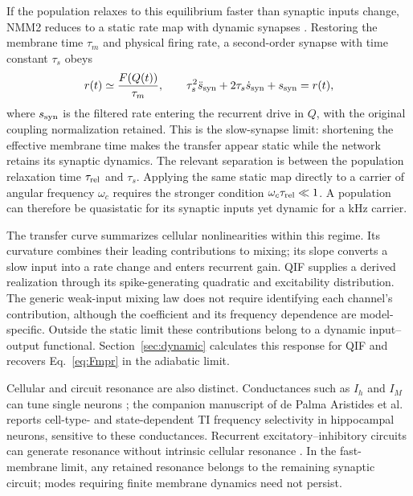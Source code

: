 \documentclass[11pt,a4paper]{article}
\begin{document}
If the population relaxes to this equilibrium faster than synaptic inputs change,
NMM2 reduces to a static rate map with dynamic synapses
\cite{ruffini2021nmm2,clusella2023}. Restoring the membrane time $\tau_m$ and physical
firing rate, a second-order synapse with time constant $\tau_s$ obeys
\begin{equation}
r(t)\simeq \frac{F(Q(t))}{\tau_m},\qquad
\tau_s^2\ddot s_{\rm syn}+2\tau_s\dot s_{\rm syn}+s_{\rm syn}=r(t),
\label{eq:slow_synapse}
\end{equation}
where $s_{\rm syn}$ is the filtered rate entering the recurrent drive in $Q$, with the original
coupling normalization retained. This is the slow-synapse limit: shortening the
effective membrane time makes the transfer appear static while the network retains
its synaptic dynamics. The relevant separation is between the population relaxation
time $\tau_{\rm rel}$ and $\tau_s$. Applying the same static map directly to a
carrier of angular frequency $\omega_c$ requires the stronger condition
$\omega_c\tau_{\rm rel}\ll1$. A population can therefore be quasistatic for its
synaptic inputs yet dynamic for a kHz carrier.

The transfer curve summarizes cellular nonlinearities within this regime. Its
curvature combines their leading contributions to mixing; its slope converts a
slow input into a rate change and enters recurrent gain. QIF supplies a derived
realization through its spike-generating quadratic and excitability distribution.
The generic weak-input mixing law does not require identifying each channel's
contribution, although the coefficient and its frequency dependence are
model-specific. Outside the static limit these contributions belong to a dynamic
input--output functional. Section~\ref{sec:dynamic} calculates this response for
QIF and recovers Eq.~\eqref{eq:Fmpr} in the adiabatic limit.

Cellular and circuit resonance are also distinct. Conductances such as $I_h$ and
$I_M$ can tune single neurons \cite{hutcheonyarom2000}; the companion manuscript of
de Palma Aristides et al.\ \cite{depalma2026ti} reports cell-type- and state-dependent
TI frequency selectivity in hippocampal neurons, sensitive to these conductances.
Recurrent excitatory--inhibitory circuits can generate resonance without intrinsic
cellular resonance \cite{brunelhakim1999,brunelwang2003}. In the fast-membrane limit,
any retained resonance belongs to the remaining synaptic circuit; modes requiring
finite membrane dynamics need not persist.
\end{document}
